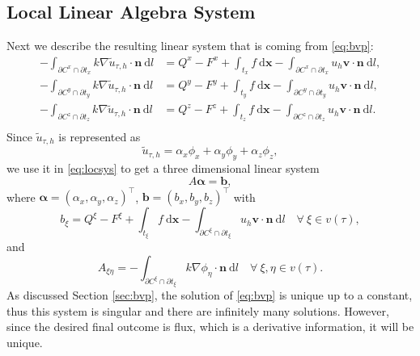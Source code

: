 \documentclass[times]{nlaauth}
\numberwithin{equation}{section}
\begin{document}
\subsection{Local Linear Algebra System } \label{sec:llas}
Next we describe the resulting linear system that is coming from
\eqref{eq:bvp}:
\begin{equation} \label{eq:locsys}
\begin{aligned}
- \int_{ \partial C^x \cap \partial t_x } k \nabla \widetilde u_{\tau, h} \cdot \boldsymbol{n}  \ \text{d} l & = Q^x - F^x + \int_{t_x} f \ \text{d} \boldsymbol{x} - \int_{ \partial C^x \cap \partial t_x  } u_h \boldsymbol{v} \cdot \boldsymbol{n}  \ \text{d} l, \\
- \int_{ \partial C^y \cap \partial t_y } k  \nabla \widetilde u_{\tau, h} \cdot \boldsymbol{n}  \ \text{d} l & = Q^y - F^y + \int_{t_y} f \ \text{d} \boldsymbol{x} - \int_{\partial C^y \cap \partial t_y } u_h \boldsymbol{v} \cdot \boldsymbol{n}  \ \text{d} l, \\
- \int_{ \partial C^z \cap \partial t_z } k \nabla \widetilde u_{\tau, h} \cdot \boldsymbol{n}  \ \text{d} l & = Q^z - F^z + \int_{t_z} f \ \text{d} \boldsymbol{x} - \int_{\partial C^z \cap \partial t_z} u_h \boldsymbol{v} \cdot \boldsymbol{n}  \ \text{d} l. \\
\end{aligned}
\end{equation}
Since $\widetilde u_{\tau, h}$ is represented as
\begin{equation} \label{eq:ppsol}
\widetilde u_{\tau, h} = \alpha_x \phi_x + \alpha_y \phi_y + \alpha_z \phi_z,
\end{equation}
we use it in \eqref{eq:locsys} to get a three dimensional linear system
$$
A \boldsymbol{\alpha} = \boldsymbol{b},
$$
where $\boldsymbol{\alpha} = (\alpha_x, \alpha_y, \alpha_z)^\top $,
$ \boldsymbol{b} = (b_x, b_y, b_z)^\top $ with 
$$
b_\xi = Q^\xi - F^\xi + \int_{t_\xi} f \ \text{d} \boldsymbol{x} - \int_{ \partial C^\xi \cap \partial t_\xi  } u_h \boldsymbol{v} \cdot \boldsymbol{n}  \ \text{d} l \quad \forall \ \xi\in v(\tau),
$$
and
$$
A_{\xi\eta} = -\int_{ \partial C^\xi \cap \partial t_\xi  } k \nabla \phi_\eta \cdot \boldsymbol{n} \ \text{d} l \quad \forall\ \xi, \eta \in v(\tau).
$$
As discussed Section \ref{sec:bvp}, the solution of \eqref{eq:bvp} is unique up to a constant, thus this system is singular and there are infinitely many solutions. However, since the desired final outcome is flux, which is a derivative information, it will be unique.
\end{document}
